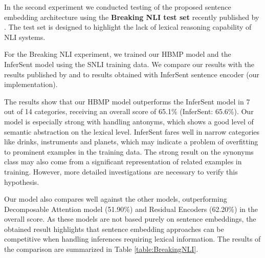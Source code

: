 \documentclass{nle}
\begin{document}
In the second experiment we conducted testing of the proposed sentence embedding architecture using the \textbf{Breaking NLI test set} recently published by \cite{breakingNLI}. The test set is designed to highlight the lack of lexical reasoning capability of NLI systems.

For the Breaking NLI experiment, we trained our HBMP model and the InferSent model using the SNLI training data. We compare our results with the results published by \cite{breakingNLI} and to results obtained with InferSent sentence encoder (our implementation).

The results show that our HBMP model outperforms the InferSent model in 7 out of 14 categories, receiving an overall score of 65.1\% (InferSent: 65.6\%). Our model is especially strong with handling antonyms, which shows a good level of semantic abstraction on the lexical level.
InferSent fares well in narrow categories like drinks, instruments and planets, which may indicate a problem of overfitting to prominent examples in the training data. The strong result on the synonyms class may also come from a significant representation of related examples in training. However, more detailed investigations are necessary to verify this hypothesis.

Our model also compares well against the other models, outperforming Decomposable Attention model (51.90\%) \citep{ParikhT0U16} and Residual Encoders (62.20\%) \citep{Nie:repeval} in the overall score. As these models are not based purely on sentence embeddings, the obtained result highlights that sentence embedding approaches can be competitive when handling inferences requiring lexical information. The results of the comparison are summarized in Table \ref{table:BreakingNLI}.
\end{document}
